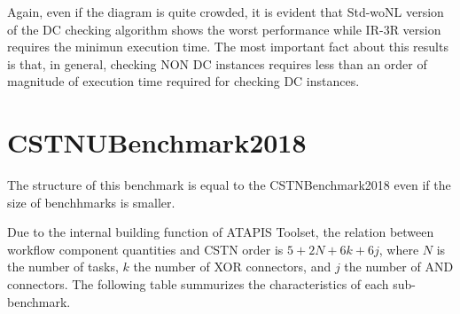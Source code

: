 \documentclass[a4paper,11pt]{article}
\begin{document}
Again, even if the diagram is quite crowded, it is evident that \textrm{Std-woNL} version of the DC checking algorithm shows the worst performance while
\textrm{IR-3R} version requires the minimun execution time. The most important fact about this results is that, in general, checking NON DC instances requires 
less than an order of magnitude of execution time required for checking DC instances. 




\section{CSTNUBenchmark2018}

The structure of this benchmark is equal to the CSTNBenchmark2018 even if the size of benchhmarks is smaller.

Due to the internal building function of ATAPIS Toolset, the relation between workflow component quantities and CSTN order is $5+2N+6k+6j$, where $N$ is the number of tasks, $k$ the number of XOR connectors, and $j$ the number of AND connectors. 
The following table summurizes the characteristics of each sub-benchmark.
\end{document}
